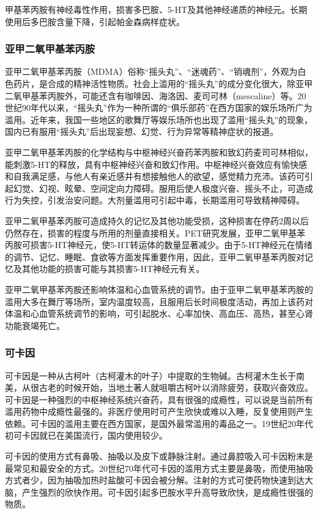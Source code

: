 甲基苯丙胺有神经毒性作用，损害多巴胺、5-HT及其他神经递质的神经元。长期使用后多巴胺含量下降，引起帕金森病样症状。

\subsubsection{亚甲二氧甲基苯丙胺}

亚甲二氧甲基苯丙胺（MDMA）俗称“摇头丸”、“迷魂药”、“销魂剂”，外观为白色药片，是合成的精神活性物质。社会上滥用的“摇头丸”的成分变化很大，除亚甲二氧甲基苯丙胺外，可能还含有咖啡因、海洛因、麦司可林（mescaline）等。20世纪90年代以来，“摇头丸”作为一种所谓的“俱乐部药”在西方国家的娱乐场所广为滥用。近年来，我国一些地区的歌舞厅等娱乐场所也出现了滥用“摇头丸”的现象，国内已有服用“摇头丸”后出现妄想、幻觉、行为异常等精神症状的报道。

亚甲二氧甲基苯丙胺的化学结构与中枢神经兴奋药苯丙胺和致幻药麦司可林相似，能刺激5-HT的释放，具有中枢神经兴奋和致幻作用。中枢神经兴奋效应有愉快感和自我满足感，与他人有亲近感并有想接触他人的欲望，感觉精力充沛。该药可引起幻觉、幻视、眩晕、空间定向力障碍。服用后使人极度兴奋、摇头不止，可造成行为失控，引发治安问题。大剂量滥用可引起中毒，长期滥用可导致精神障碍。

亚甲二氧甲基苯丙胺可造成持久的记忆及其他功能受损，这种损害在停药2周以后仍然存在，损害的程度与所用的剂量直接相关。PET研究发展，亚甲二氧甲基苯丙胺可损害5-HT神经元，使5-HT转运体的数量显著减少。由于5-HT神经元在情绪的调节、记忆、睡眠、食欲等方面发挥重要作用，因此，亚甲二氧甲基苯丙胺对记忆及其他功能的损害可能与其损害5-HT神经元有关。

亚甲二氧甲基苯丙胺还影响体温和心血管系统的调节。由于亚甲二氧甲基苯丙胺的滥用大多在舞厅等场所，室内温度较高，且服用后长时间极度活动，再加上该药对体温和心血管系统调节的影响，可引起脱水、心率加快、高血压、高热，甚至心肾功能衰竭死亡。

\subsubsection{可卡因}

可卡因是一种从古柯叶（古柯灌木的叶子）中提取的生物碱。古柯灌木生长于南美，从很古老的时候开始，当地土著人就咀嚼古柯叶以消除疲劳，获取兴奋效应。可卡因是一种强烈的中枢神经系统兴奋药，具有很强的成瘾性，可以说是当前所有滥用药物中成瘾性最强的。非医疗使用时可产生欣快或难以入睡，反复使用则产生依赖。可卡因的滥用主要在西方国家，是国外最常滥用的毒品之一。19世纪20年代初可卡因就已在美国流行，国内使用较少。

可卡因的使用方式有鼻吸、抽吸以及皮下或静脉注射。通过鼻腔吸入可卡因粉末是最常见和最安全的方式。20世纪70年代可卡因的滥用方式主要是鼻吸，而使用抽吸方式者少，因为抽吸加热时盐酸可卡因会被分解。注射的方式可使药物快速到达大脑，产生强烈的欣快作用。可卡因引起多巴胺水平升高导致欣快，是成瘾性很强的物质。

